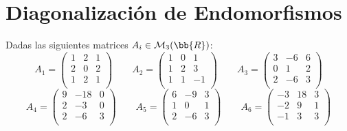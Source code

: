 \section{Diagonalización de Endomorfismos}\label{sec:EjerciciosTema1}


\begin{ejercicio}
    Dadas las siguientes matrices $A_i\in\mathcal{M}_3(\bb{R})$:
    \begin{equation*}
        A_1 = \left( \begin{array}{ccc}
            1 & 2 & 1 \\
            2 & 0 & 2 \\
            1 & 2 & 1 \\
        \end{array}\right) \qquad
        A_2 = \left( \begin{array}{ccc}
            1 & 0 & 1 \\
            1 & 2 & 3 \\
            1 & 1 & -1 \\
        \end{array}\right) \qquad
        A_3 = \left( \begin{array}{ccc}
            3 & -6 & 6 \\
            0 & 1 & 2 \\
            2 & -6 & 3 \\
        \end{array}\right)
    \end{equation*}
    \begin{equation*}
        A_4 = \left( \begin{array}{ccc}
            9 & -18 & 0 \\
            2 & -3 & 0 \\
            2 & -6 & 3 \\
        \end{array}\right) \qquad
        A_5 = \left( \begin{array}{ccc}
            6 & -9 & 3 \\
            1 & 0 & 1 \\
            2 & -6 & 3 \\
        \end{array}\right) \qquad
        A_6 = \left( \begin{array}{ccc}
            -3 & 18 & 3 \\
            -2 & 9 & 1 \\
            -1 & 3 & 3 \\
        \end{array}\right)
    \end{equation*}


\end{ejercicio}
